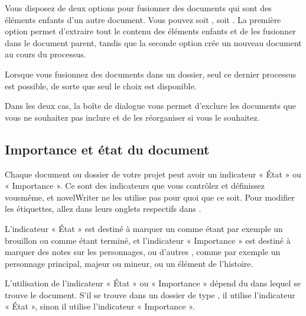 \documentclass[a4paper,11pt,french]{sphinxmanual}
\begin{document}
\sphinxAtStartPar
Vous disposez de deux options pour fusionner des documents qui sont des éléments enfants d’un autre document. Vous pouvez soit , soit . La première option permet d’extraire tout le contenu des éléments enfants et de les fusionner dans le document parent, tandis que la seconde option crée un nouveau document au cours du processus.

\sphinxAtStartPar
Lorsque vous fusionnez des documents dans un dossier, seul ce dernier processus est possible, de sorte que seul le choix  est disponible.

\sphinxAtStartPar
Dans les deux cas, la boîte de dialogue  vous permet d’exclure les documents que vous ne souhaitez pas inclure et de les réorganiser si vous le souhaitez.


\subsection{Importance et état du document}
\label{\detokenize{usage_project:document-importance-and-status}}\label{\detokenize{usage_project:a-ui-tree-status}}
\sphinxAtStartPar
Chaque document ou dossier de votre projet peut avoir un indicateur « État » ou « Importance ». Ce sont des indicateurs que vous contrôlez et définissez vous\sphinxhyphen{}même, et novelWriter ne les utilise pas pour quoi que ce soit. Pour modifier les étiquettes, allez dans leurs onglets respectifs dans .

\sphinxAtStartPar
L’indicateur « État » est destiné à marquer un {\hyperref[\detokenize{int_glossary:term-Novel-Documents}]{}} comme étant par exemple un brouillon ou comme étant terminé, et l’indicateur « Importance » est destiné à marquer des notes sur les personnages, ou d’autres {\hyperref[\detokenize{int_glossary:term-Project-Notes}]{}}, comme par exemple un personnage principal, majeur ou mineur, ou un élément de l’histoire.

\sphinxAtStartPar
L’utilisation de l’indicateur « État » ou « Importance » dépend du {\hyperref[\detokenize{int_glossary:term-Root-Folder}]{}} dans lequel se trouve le document. S’il se trouve dans un dossier de type , il utilise l’indicateur « État », sinon il utilise l’indicateur « Importance ».
\end{document}
